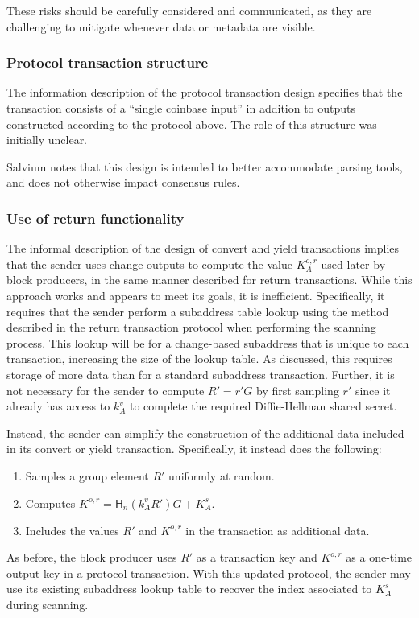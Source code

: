 \documentclass{article}
\newcommand{\hash}{\mathsf{H}_n}
\begin{document}
These risks should be carefully considered and communicated, as they are challenging to mitigate whenever data or metadata are visible.


\subsubsection{Protocol transaction structure}

The information description of the protocol transaction design specifies that the transaction consists of a ``single coinbase input'' in addition to outputs constructed according to the protocol above.
The role of this structure was initially unclear.

Salvium notes that this design is intended to better accommodate parsing tools, and does not otherwise impact consensus rules.


\subsubsection{Use of return functionality}

The informal description of the design of convert and yield transactions implies that the sender uses change outputs to compute the value $K_A^{o,r}$ used later by block producers, in the same manner described for return transactions.
While this approach works and appears to meet its goals, it is inefficient.
Specifically, it requires that the sender perform a subaddress table lookup using the method described in the return transaction protocol when performing the scanning process.
This lookup will be for a change-based subaddress that is unique to each transaction, increasing the size of the lookup table.
As discussed, this requires storage of more data than for a standard subaddress transaction.
Further, it is not necessary for the sender to compute $R' = r' G$ by first sampling $r'$ since it already has access to $k_A^v$ to complete the required Diffie-Hellman shared secret.

Instead, the sender can simplify the construction of the additional data included in its convert or yield transaction.
Specifically, it instead does the following:
\begin{enumerate}
	\item Samples a group element $R'$ uniformly at random.
	\item Computes $K^{o,r} = \hash(k_A^v R') G + K_A^s$.
	\item Includes the values $R'$ and $K^{o,r}$ in the transaction as additional data.
\end{enumerate}
As before, the block producer uses $R'$ as a transaction key and $K^{o,r}$ as a one-time output key in a protocol transaction.
With this updated protocol, the sender may use its existing subaddress lookup table to recover the index associated to $K_A^s$ during scanning.
\end{document}
